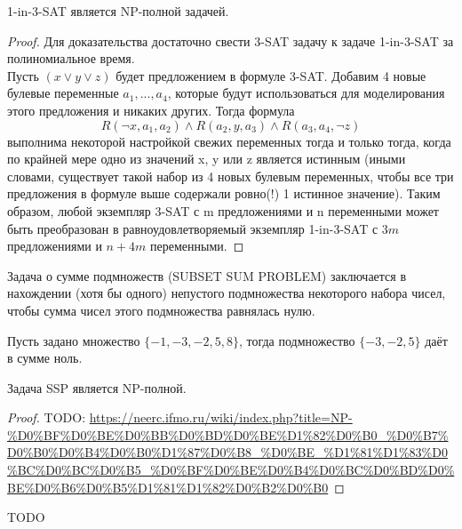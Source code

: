     \begin{Thm}
        1-in-3-SAT является NP-полной задачей.
    \end{Thm}
    \begin{proof}
        Для доказательства достаточно свести 3-SAT задачу к задаче 1-in-3-SAT за полиномиальное время.\\
        Пусть $(x \vee y \vee z)$ будет предложением в формуле 3-SAT. Добавим 4 новые булевые переменные $a_1, ..., a_4$, которые будут использоваться для моделирования этого предложения и никаких других. Тогда формула $$R(\neg x,a_1, a_2) \wedge R(a_2, y, a_3) \wedge R(a_3, a_4, \neg z)$$ выполнима некоторой настройкой свежих переменных тогда и только тогда, когда по крайней мере одно из значений x, y или z является истинным (иными словами, существует такой набор из 4 новых булевым переменных, чтобы все три предложения в формуле выше содержали ровно(!) 1 истинное значение). Таким образом, любой экземпляр 3-SAT с m предложениями и n переменными может быть преобразован в равноудовлетворяемый экземпляр 1-in-3-SAT с $3m$ предложениями и $n + 4m$ переменными.
    \end{proof}
    \begin{Def}
        Задача о сумме подмножеств (SUBSET SUM PROBLEM) заключается в нахождении (хотя бы одного) непустого подмножества некоторого набора чисел, чтобы сумма чисел этого подмножества равнялась нулю.
    \end{Def}
    \begin{Example}
        Пусть задано множество $\{-1, -3, -2, 5, 8\}$, тогда подмножество $\{-3, -2, 5\}$ даёт в сумме ноль.
    \end{Example}
    \begin{Thm}
        Задача SSP является NP-полной.
    \end{Thm}
    \begin{proof}
    TODO:
        \url{https://neerc.ifmo.ru/wiki/index.php?title=NP-%D0%BF%D0%BE%D0%BB%D0%BD%D0%BE%D1%82%D0%B0_%D0%B7%D0%B0%D0%B4%D0%B0%D1%87%D0%B8_%D0%BE_%D1%81%D1%83%D0%BC%D0%BC%D0%B5_%D0%BF%D0%BE%D0%B4%D0%BC%D0%BD%D0%BE%D0%B6%D0%B5%D1%81%D1%82%D0%B2%D0%B0}
    \end{proof}
    \begin{Def}
        TODO
    \end{Def}

    
    
